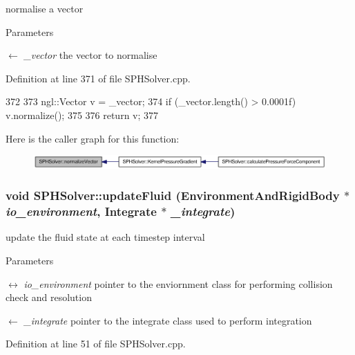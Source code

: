 normalise a vector 


\begin{DoxyParams}{Parameters}
\item[\mbox{$\leftarrow$} {\em \_\-vector}]the vector to normalise \end{DoxyParams}


Definition at line 371 of file SPHSolver.cpp.




\begin{DoxyCode}
372 {
373     ngl::Vector v = _vector;
374     if (_vector.length() > 0.0001f) v.normalize();
375 
376     return v;
377 }
\end{DoxyCode}




Here is the caller graph for this function:\nopagebreak
\begin{figure}[H]
\begin{center}
\leavevmode
\includegraphics[width=325pt]{class_s_p_h_solver_a22ef88cb68a8f4befa6f281e10cf65a6_icgraph}
\end{center}
\end{figure}


\hypertarget{class_s_p_h_solver_a38ef1e0f18763b28118e3be3a8ba7d08}{
\subsubsection[{updateFluid}]{\setlength{\rightskip}{0pt plus 5cm}void SPHSolver::updateFluid ({\bf EnvironmentAndRigidBody} $\ast$ {\em io\_\-environment}, \/  {\bf Integrate} $\ast$ {\em \_\-integrate})}}
\label{class_s_p_h_solver_a38ef1e0f18763b28118e3be3a8ba7d08}


update the fluid state at each timestep interval 


\begin{DoxyParams}{Parameters}
\item[\mbox{$\leftrightarrow$} {\em io\_\-environment}]pointer to the enviornment class for performing collision check and resolution \item[\mbox{$\leftarrow$} {\em \_\-integrate}]pointer to the integrate class used to perform integration \end{DoxyParams}


Definition at line 51 of file SPHSolver.cpp.




